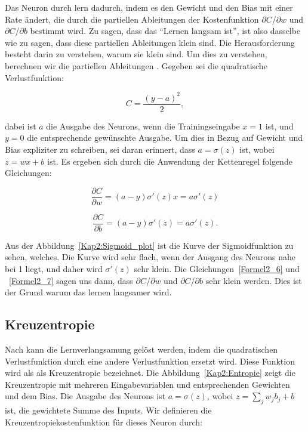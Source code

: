     Das Neuron durch lern dadurch, indem es den Gewicht und den Bias mit einer Rate ändert, die durch die partiellen Ableitungen der Kostenfunktion $\partial$$C$/$\partial$$w$ und $\partial$$C$/$\partial$$b$ bestimmt wird. Zu sagen, dass  das \enquote{Lernen langsam ist}, ist also dasselbe wie zu sagen, dass diese partiellen Ableitungen klein sind. Die Herausforderung besteht darin zu verstehen, warum sie klein sind. Um dies zu verstehen, berechnen wir die partiellen Ableitungen \cite*[61]{Nielsen2015}. Gegeben sei die quadratische Verlustfunktion:

    \begin{equation} \label{Formel2_5}
      C=\frac{( y-a)^{2}}{2},
    \end{equation}

    dabei ist $a$ die Ausgabe des Neurons, wenn die Trainingseingabe $x = 1$ ist, und $y = 0$ die entsprechende gewünschte Ausgabe. Um dies in Bezug auf Gewicht und Bias expliziter zu schreiben, sei daran erinnert, dass $a = \sigma(z)$ ist, wobei $z = wx + b$ ist. Es ergeben sich durch die Anwendung der Kettenregel folgende Gleichungen:

    \begin{equation} \label{Formel2_6}
      \frac{\partial C}{\partial w} =( a-y) \sigma '( z) x=a\sigma '( z)
    \end{equation}

    \begin{equation} \label{Formel2_7}
      \frac{\partial C}{\partial b} =( a-y) \sigma '( z) =a\sigma '( z).
    \end{equation}

    Aus der Abbildung~\ref{Kap2:Sigmoid_plot} ist die Kurve der Sigmoidfunktion zu sehen, welches. Die Kurve wird sehr flach, wenn der Ausgang des Neurons nahe bei 1 liegt, und daher wird $\sigma'(z)$ sehr klein. Die Gleichungen~\ref{Formel2_6} und ~\ref{Formel2_7} sagen uns dann, dass $\partial$$C$/$\partial$$w$  und  $\partial$$C$/$\partial$$b$ sehr klein werden. Dies ist der Grund warum das lernen langsamer wird.

  \subsection{Kreuzentropie}
  Nach \cite*[62]{Nielsen2015} kann die Lernverlangsamung gelöst werden, indem die quadratischen Verlustfunktion durch eine andere Verlustfunktion ersetzt wird. Diese Funktion wird als als Kreuzentropie bezeichnet. Die Abbildung~\ref{Kap2:Entropie} zeigt die Kreuzentropie mit mehreren Eingabevariablen und entsprechenden Gewichten und dem Bias. Die Ausgabe des Neurons ist $a = \sigma(z)$, wobei $z =  \sum _{j} w_{j} b_{j} + b$ ist, die gewichtete Summe des Inputs. Wir definieren die Kreuzentropiekostenfunktion für dieses Neuron durch:

